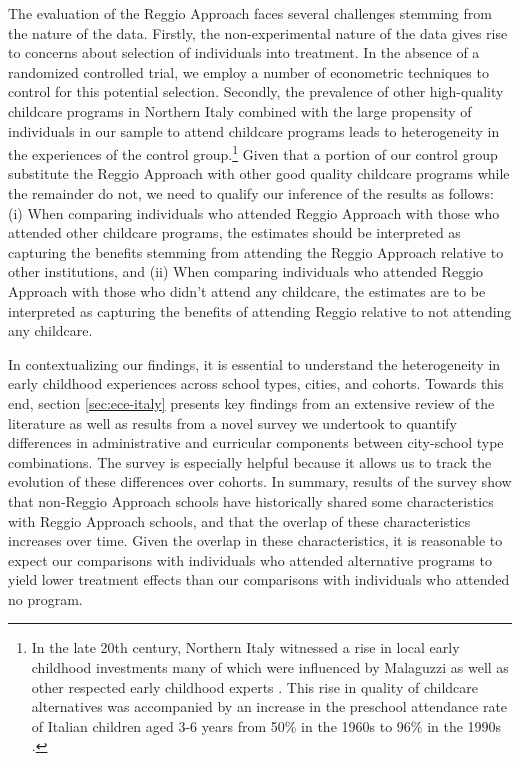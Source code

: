 The evaluation of the Reggio Approach faces several challenges stemming from the nature of the data. Firstly, the non-experimental nature of the data gives rise to concerns about selection of individuals into treatment. In the absence of a randomized controlled trial, we employ a number of econometric techniques to control for this potential selection. Secondly, the prevalence of other high-quality childcare programs in Northern Italy combined with the large propensity of individuals in our sample to attend childcare programs leads to heterogeneity in the experiences of the control group.\footnote{In the late 20th century, Northern Italy witnessed a rise in local early childhood investments many of which were influenced by Malaguzzi as well as other respected early childhood experts \citep{OECD_2001_Italy-Country-Note}. This rise in quality of childcare alternatives was accompanied by an increase in the preschool attendance rate of Italian children aged 3-6 years from 50\% in the 1960s to 96\% in the 1990s \citep{Hohnerlein_2015_Development-and-Diffusion}.} Given that a portion of our control group substitute the Reggio Approach with other good quality childcare programs while the remainder do not, we need to qualify our inference of the results as follows: (i) When comparing individuals who attended Reggio Approach with those who attended other childcare programs, the estimates should be interpreted as capturing the benefits stemming from attending the Reggio Approach relative to other institutions, and (ii) When comparing individuals who attended Reggio Approach with those who didn't attend any childcare, the estimates are to be interpreted as capturing the benefits of attending Reggio relative to not attending any childcare.

In contextualizing our findings, it is essential to understand the heterogeneity in early childhood experiences across school types, cities, and cohorts. Towards this end, section \ref{sec:ece-italy} presents key findings from an extensive review of the literature as well as results from a novel survey we undertook to quantify differences in administrative and curricular components between city-school type combinations. The survey is especially helpful because it allows us to track the evolution of these differences over cohorts. In summary, results of the survey show that non-Reggio Approach schools have historically shared some characteristics with Reggio Approach schools, and that the overlap of these characteristics increases over time. Given the overlap in these characteristics, it is reasonable to expect our comparisons with individuals who attended alternative programs to yield lower treatment effects than our comparisons with individuals who attended no program.


